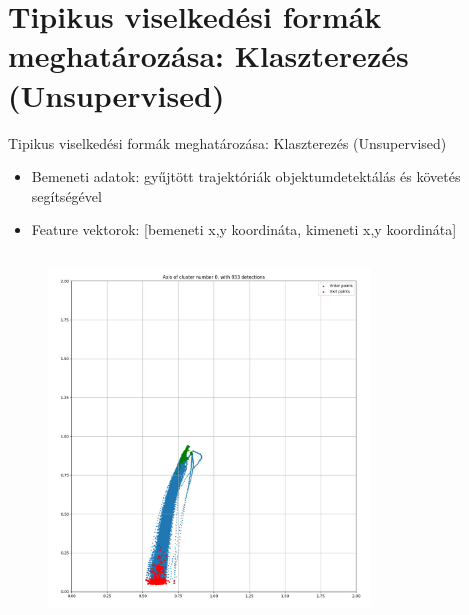 \documentclass{beamer}
\begin{document}
\section{Tipikus viselkedési formák meghatározása: Klaszterezés (Unsupervised)}
\begin{frame}{Tipikus viselkedési formák meghatározása: Klaszterezés (Unsupervised)}
    \begin{itemize}
        \item Bemeneti adatok: gyűjtött trajektóriák objektumdetektálás és követés segítségével
        \item Feature vektorok: [bemeneti x,y koordináta, kimeneti x,y koordináta]
    \end{itemize}
    \begin{columns}
        \begin{figure}
            \includegraphics[scale=0.1]{../clustering/n_cluster_0_n_tracks_933_cropped.jpg}
        \end{figure}
        \begin{figure}

\end{figure}
\end{columns}
\end{frame}
\end{document}
